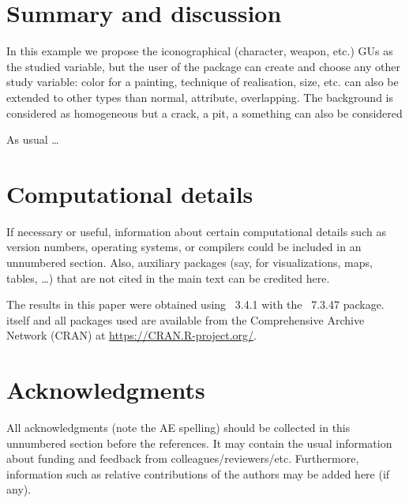 \documentclass[article]{jss}\usepackage{knitr}
\begin{document}

\section{Summary and discussion} \label{sec:summary}

In this example we propose the iconographical  (character, weapon, etc.) GUs as the studied variable, but the user of the package can create and choose any other study variable: color for a painting, technique of realisation, size, etc.
 can also be extended to other types than normal, attribute, overlapping.
The background is considered as homogeneous but a crack, a pit, a something can also be considered

\begin{leftbar}
As usual \dots
\end{leftbar}



\section*{Computational details}

\begin{leftbar}
If necessary or useful, information about certain computational details
such as version numbers, operating systems, or compilers could be included
in an unnumbered section. Also, auxiliary packages (say, for visualizations,
maps, tables, \dots) that are not cited in the main text can be credited here.
\end{leftbar}

The results in this paper were obtained using
~3.4.1 with the
~7.3.47 package.  itself
and all packages used are available from the Comprehensive
 Archive Network (CRAN) at
\url{https://CRAN.R-project.org/}.


\section*{Acknowledgments}

\begin{leftbar}
All acknowledgments (note the AE spelling) should be collected in this
unnumbered section before the references. It may contain the usual information
about funding and feedback from colleagues/reviewers/etc. Furthermore,
information such as relative contributions of the authors may be added here
(if any).
\end{leftbar}
\end{document}
